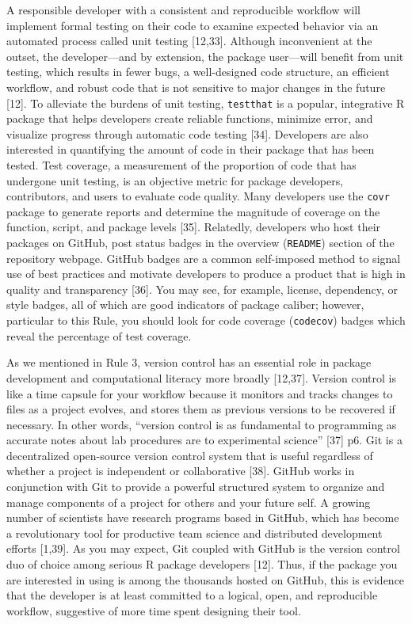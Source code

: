 \documentclass[10pt,letterpaper]{article}
\begin{document}
A responsible developer with a consistent and reproducible workflow will
implement formal testing on their code to examine expected behavior via
an automated process called unit testing {[}12,33{]}. Although
inconvenient at the outset, the developer---and by extension, the
package user---will benefit from unit testing, which results in fewer
bugs, a well-designed code structure, an efficient workflow, and robust
code that is not sensitive to major changes in the future {[}12{]}. To
alleviate the burdens of unit testing, \texttt{testthat} is a popular,
integrative R package that helps developers create reliable functions,
minimize error, and visualize progress through automatic code testing
{[}34{]}. Developers are also interested in quantifying the amount of
code in their package that has been tested. Test coverage, a measurement
of the proportion of code that has undergone unit testing, is an
objective metric for package developers, contributors, and users to
evaluate code quality. Many developers use the \texttt{covr} package to
generate reports and determine the magnitude of coverage on the
function, script, and package levels {[}35{]}. Relatedly, developers who
host their packages on GitHub, post status badges in the overview
(\texttt{README}) section of the repository webpage. GitHub badges are a
common self-imposed method to signal use of best practices and motivate
developers to produce a product that is high in quality and transparency
{[}36{]}. You may see, for example, license, dependency, or style
badges, all of which are good indicators of package caliber; however,
particular to this Rule, you should look for code coverage
(\texttt{codecov}) badges which reveal the percentage of test coverage.

As we mentioned in Rule 3, version control has an essential role in
package development and computational literacy more broadly {[}12,37{]}.
Version control is like a time capsule for your workflow because it
monitors and tracks changes to files as a project evolves, and stores
them as previous versions to be recovered if necessary. In other words,
``version control is as fundamental to programming as accurate notes
about lab procedures are to experimental science'' {[}37{]} p6. Git is a
decentralized open-source version control system that is useful
regardless of whether a project is independent or collaborative
{[}38{]}. GitHub works in conjunction with Git to provide a powerful
structured system to organize and manage components of a project for
others and your future self. A growing number of scientists have
research programs based in GitHub, which has become a revolutionary tool
for productive team science and distributed development efforts
{[}1,39{]}. As you may expect, Git coupled with GitHub is the version
control duo of choice among serious R package developers {[}12{]}. Thus,
if the package you are interested in using is among the thousands hosted
on GitHub, this is evidence that the developer is at least committed to
a logical, open, and reproducible workflow, suggestive of more time
spent designing their tool.
\end{document}
